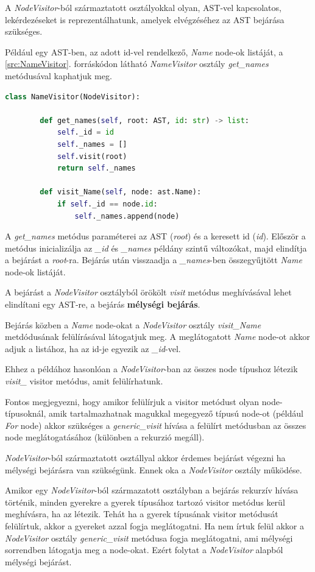 A \emph{NodeVisitor}-ból származtatott osztályokkal olyan, AST-vel kapcsolatos,
lekérdezéseket is reprezentálhatunk, amelyek elvégzéséhez az AST bejárása szükséges.

Például egy AST-ben, az adott id-vel rendelkező, \emph{Name} node-ok listáját,
a \ref{src:NameVisitor}. forráskódon látható \emph{NameVisitor} osztály
\emph{get\_names} metódusával kaphatjuk meg.

\begin{lstlisting}[language={Python}]
	class NameVisitor(NodeVisitor):
		
		def get_names(self, root: AST, id: str) -> list:
			self._id = id
			self._names = []
			self.visit(root)
			return self._names
		
		def visit_Name(self, node: ast.Name):
			if self._id == node.id:
				self._names.append(node)
\end{lstlisting}

A \emph{get\_names} metódus paraméterei az AST (\emph{root}) és a keresett id (\emph{id}).
Először a metódus inicializálja az \emph{\_id} és \emph{\_names} példány szintű változókat,
majd elindítja a bejárást a \emph{root}-ra.
Bejárás után visszaadja a \emph{\_names}-ben összegyűjtött \emph{Name} node-ok listáját.

A bejárást a \emph{NodeVisitor} osztályból örökölt \emph{visit} metódus meghívásával
lehet elindítani egy AST-re, a bejárás \textbf{mélységi bejárás}.

Bejárás közben a \emph{Name} node-okat a \emph{NodeVisitor} osztály \emph{visit\_Name}
metdódusának felülírásával látogatjuk meg.
A meglátogatott \emph{Name} node-ot akkor adjuk a listához,
ha az id-je egyezik az \emph{\_id}-vel.

Ehhez a példához hasonlóan a \emph{NodeVisitor}-ban az összes node típushoz
létezik \emph{visit\_<node-class>} visitor metódus, amit felülírhatunk.

Fontos megjegyezni, hogy amikor felülírjuk a visitor metódust olyan node-típusoknál,
amik tartalmazhatnak magukkal megegyező típusú node-ot (például \emph{For} node)
akkor szükséges a \emph{generic\_visit} hívása a felülírt metódusban
az összes node meglátogatásához (különben a rekurzió megáll).

\emph{NodeVisitor}-ból származtatott osztállyal akkor érdemes bejárást végezni ha
mélységi bejárásra van szükségünk.
Ennek oka a \emph{NodeVisitor} osztály működése.

Amikor egy \emph{NodeVisitor}-ból származatott osztályban a bejárás rekurzív hívása történik,
minden gyerekre a gyerek típusához tartozó visitor metódus kerül meghívásra, ha az létezik.
Tehát ha a gyerek típusának visitor metódusát felülírtuk, akkor a gyereket azzal fogja meglátogatni.
Ha nem írtuk felül akkor a \emph{NodeVisitor} osztály
\emph{generic\_visit} metódusa fogja meglátogatni,
ami mélységi sorrendben látogatja meg a node-okat.
Ezért folytat a \emph{NodeVisitor} alapból mélységi bejárást.

